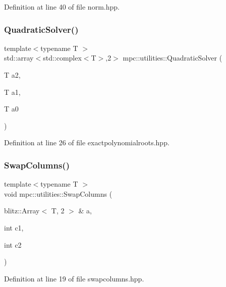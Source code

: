 Definition at line 40 of file norm.\+hpp.

\mbox{\label{namespacempc_1_1utilities_ad175f8823052a6c863ffb2e90e2b08ca}} 
\subsubsection{\texorpdfstring{Quadratic\+Solver()}{QuadraticSolver()}}
{\footnotesize\ttfamily template$<$typename T $>$ \\
std\+::array$<$std\+::complex$<$T$>$,2$>$ mpc\+::utilities\+::\+Quadratic\+Solver (\begin{DoxyParamCaption}\item[{T}]{a2,  }\item[{T}]{a1,  }\item[{T}]{a0 }\end{DoxyParamCaption})}



Definition at line 26 of file exactpolynomialroots.\+hpp.

\mbox{\label{namespacempc_1_1utilities_a86772b476b0e0aa1567f42c8a9aa7a3c}} 
\subsubsection{\texorpdfstring{Swap\+Columns()}{SwapColumns()}}
{\footnotesize\ttfamily template$<$typename T $>$ \\
void mpc\+::utilities\+::\+Swap\+Columns (\begin{DoxyParamCaption}\item[{blitz\+::\+Array$<$ T, 2 $>$ \&}]{a,  }\item[{int}]{c1,  }\item[{int}]{c2 }\end{DoxyParamCaption})}



Definition at line 19 of file swapcolumns.\+hpp.

\mbox{\label{namespacempc_1_1utilities_a7dc82dae028a331f955ec8a5aa3599a4}} 
